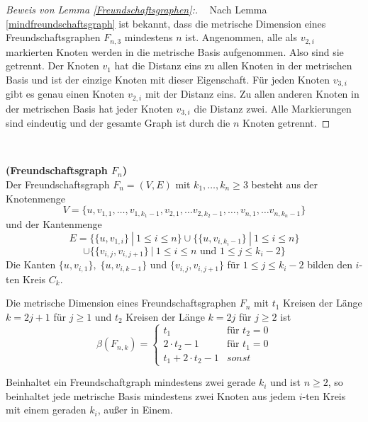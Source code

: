 \newpage
\begin{proof}[Beweis von Lemma \ref{Freundschaftsgraphen}:] \vspace{+1mm} ~ \linebreak
Nach Lemma \ref{mindfreundschaftsgraph} ist bekannt, dass die metrische Dimension eines Freundschaftsgraphen $F_{n,3}$ mindestens $n$ ist. Angenommen, alle als $v_{2,i}$ markierten Knoten werden in die metrische Basis aufgenommen. Also sind sie getrennt. Der Knoten $v_1$ hat die Distanz eins zu allen Knoten in der metrischen Basis und ist der einzige Knoten mit dieser Eigenschaft. Für jeden Knoten $v_{3,i}$ gibt es genau einen Knoten $v_{2,i}$ mit der Distanz eins. Zu allen anderen Knoten in der metrischen Basis hat jeder Knoten $v_{3,i}$ die Distanz zwei. Alle Markierungen sind eindeutig und der gesamte Graph ist durch die $n$ Knoten getrennt.
\end{proof}
\vspace{-14mm}
~ \linebreak
\begin{defi}{\textbf{(Freundschaftsgraph $F_n$)}}\\
Der Freundschaftsgraph $F_{n}=(V,E)$ mit $k_1,\ldots, k_n \geq 3 $ besteht aus der Knotenmenge $$V = \{u,v_{1,1}, \ldots, v_{1,k_1-1},v_{2,1},\ldots v_{2,k_2-1},\ldots,v_{n,1},\ldots v_{n,k_n-1}\}$$ und der Kantenmenge $$E = \{ \{u,v_{1,i}\}~|~ 1 \leq i \leq n \} \cup \{ \{u,v_{i,k_i-1}\}~|~ 1 \leq i \leq n \}$$$$\cup \{ \{ v_{i,j}, v_{i,j+1} \} ~|~ 1 \leq i \leq n \text{ und }1 \leq j \leq k_i-2\}$$
Die Kanten $\{u,v_{i,1}\},\;\{u,v_{i,k-1}\}$ und $\{v_{i,j},v_{i,j+1}\}$ für $1 \leq j \leq k_i-2$ bilden den $i$-ten Kreis $C_k$.
\end{defi}

\begin{lem} \cite{amal}
\label{verallgFreundschaftsgraphen}
Die metrische Dimension eines Freundschaftsgraphen $F_{n}$ mit $t_1$ Kreisen der Länge $k=2j+1$ für $j \geq 1$ und $t_2$ Kreisen der Länge $k=2j$ für $j \geq 2$ ist 
\begin{equation}
   \beta(F_{n,k})=
   \begin{cases}
     t_1 & \text{f\"ur } t_2=0 \\
     2\cdot t_2-1 & \text{f\"ur } t_1=0 \\
     t_1+ 2\cdot t_2-1 & sonst
   \end{cases}
\end{equation}
\end{lem}
\begin{lem}
Beinhaltet ein Freundschaftgraph mindestens zwei gerade $k_i$ und ist $n\geq 2$, so beinhaltet jede metrische Basis mindestens zwei Knoten aus jedem $i$-ten Kreis mit einem geraden $k_i$, außer in Einem.  
\end{lem}

